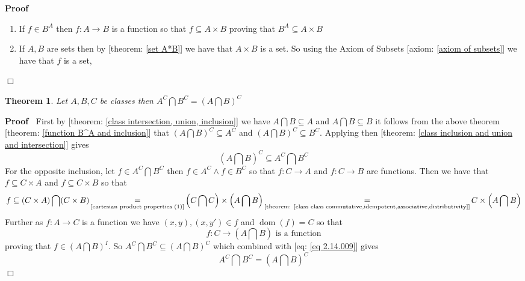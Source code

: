 \documentclass{book}
\newcommand{\equallim}{\mathop{=}\limits}
\newcommand{\tmop}[1]{\ensuremath{\operatorname{#1}}}
\newenvironment{proof}{\noindent\textbf{Proof\ }}{\hspace*{\fill}$\Box$\medskip}
\newtheorem{theorem}{Theorem}
\begin{document}
\begin{proof}
  
  \begin{enumerate}
    \item If $f \in B^A$ then $f : A \rightarrow B$ is a function so that $f
    \subseteq A \times B$ proving that $B^A \subseteq A \times B$
    
    \item If $A, B$ are sets then by [theorem: \ref{set A*B}] we have that $A
    \times B$ is a set. So using the Axiom of Subsets [axiom: \ref{axiom of
    subsets}] we have that $f$ is a set,
  \end{enumerate}
\end{proof}

\begin{theorem}
  \label{function power of intersection}Let $A, B, C$ be classes then $A^C
  \bigcap B^C = \left( A \bigcap B \right)^C$
\end{theorem}

\begin{proof}
  First by [theorem: \ref{class intersection, union, inclusion}] we have $A
  \bigcap B \subseteq A$ and $A \bigcap B \subseteq B$ it follows from the
  above theorem [theorem: \ref{function B^A and inclusion}] that $\left( A
  \bigcap B \right)^C \subseteq A^C$ and $\left( A \bigcap B \right)^C
  \subseteq B^C$. Applying then [theorem: \ref{class inclusion and union and
  intersection}] gives
  \begin{equation}
    \label{eq 2.14.009} \left( A \bigcap B \right)^C \subseteq A^C \bigcap B^C
  \end{equation}
  For the opposite inclusion, let $f \in A^C \bigcap B^C$ then $f \in A^C
  \wedge f \in B^C$ so that $f : C \rightarrow A$ and $f : C \rightarrow B$
  are functions. Then we have that $f \subseteq C \times A$ and $f \subseteq C
  \times B$ so that
  \[ f \subseteq (C \times A) \bigcap (C \times B)
     \equallim_{\text{\ref{cartesian product properties (1)}}} \left( C
     \bigcap C \right) \times \left( A \bigcap B \right)
     \equallim_{\text{[theorem: \ref{class class
     commutative,idempotent,associative,distributivity}]}} C \times \left( A
     \bigcap B \right) \]
  Further as $f : A \rightarrow C$ is a function we have $(x, y), (x, y') \in
  f$ and $\tmop{dom} (f) = C$ so that
  \[ f : C \rightarrow \left( A \bigcap B \right) \text{ is a function} \]
  proving that $f \in \left( A \bigcap B \right)^I$. So $A^C \bigcap B^C
  \subseteq \left( A \bigcap B \right)^C$ which combined with [eq: \ref{eq
  2.14.009}] gives
  \[ A^C \bigcap B^C = \left( A \bigcap B \right)^C \]
\end{proof}
\end{document}
